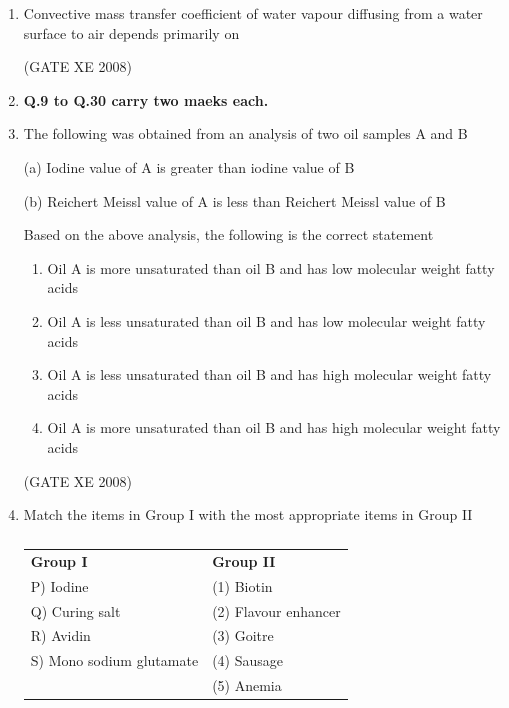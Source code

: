 \documentclass[12pt]{article}
\begin{document}
\begin{enumerate}
    \item Convective mass transfer coefficient of water vapour diffusing from a water surface to air depends primarily on 

\begin{enumerate}
\end{enumerate}
    
    (GATE XE 2008)

\item[] \textbf{Q.9 to Q.30 carry two maeks each.}    

\item The following was obtained from an analysis of two oil samples A and B  

(a) Iodine value of A is greater than iodine value of B  

(b) Reichert Meissl value of A is less than Reichert Meissl value of B  

Based on the above analysis, the following is the correct statement  

\begin{enumerate}
\item  Oil A is more unsaturated than oil B and has low molecular weight fatty acids
\item  Oil A is less unsaturated than oil B and has low molecular weight fatty acids 
\item  Oil A is less unsaturated than oil B and has high molecular weight fatty acids
\item Oil A is more unsaturated than oil B and has high molecular weight fatty acids  
\end{enumerate}

(GATE XE 2008)

\item Match the items in Group I with the most appropriate items in Group II  

\begin{table}[H]     \centering     \caption{}     \label{}     \begin{tabular}{l l}
\textbf{Group I} & \textbf{Group II} \\
P) Iodine & (1) Biotin \\
Q) Curing salt & (2) Flavour enhancer \\
R) Avidin & (3) Goitre \\
S) Mono sodium glutamate & (4) Sausage \\
 & (5) Anemia \\
\end{tabular} \end{table}  


\end{enumerate}
\end{document}
